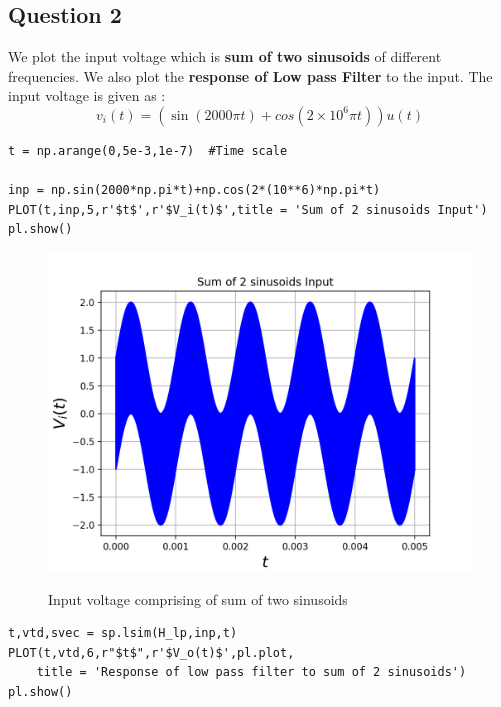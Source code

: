 \documentclass[11pt, a4paper]{article}
\begin{document}
\subsection{Question 2}
{
We plot the input voltage which is \textbf{sum of two sinusoids} of different frequencies. We also plot the \textbf{response of Low pass Filter} to the input.
}
The input voltage is given as :
\[v_i(t) = (\sin(2000\pi t) + cos(2 \times 10^6\pi t))u(t)\]
\begin{verbatim}
t = np.arange(0,5e-3,1e-7)  #Time scale

inp = np.sin(2000*np.pi*t)+np.cos(2*(10**6)*np.pi*t)
PLOT(t,inp,5,r'$t$',r'$V_i(t)$',title = 'Sum of 2 sinusoids Input')
pl.show()

\end{verbatim}
\begin{figure}[H]
   	\centering
   	\includegraphics[scale=0.5]{vi_2.png}
   	\label{fig:vi_2}
   	\caption{Input voltage comprising of sum of two sinusoids}
\end{figure}
\begin{verbatim}
t,vtd,svec = sp.lsim(H_lp,inp,t)
PLOT(t,vtd,6,r"$t$",r'$V_o(t)$',pl.plot,
	title = 'Response of low pass filter to sum of 2 sinusoids')
pl.show()

\end{verbatim}
\end{document}
